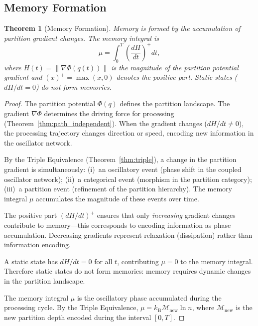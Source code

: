 \documentclass[twocolumn,10pt]{article}
\newtheorem{theorem}{Theorem}[section]
\theoremstyle{remark}
\newcommand{\kB}{k_{\mathrm{B}}}
\newcommand{\Depth}{\mathcal{M}}
\begin{document}
\subsection{Memory Formation}

\begin{theorem}[Memory Formation]
\label{thm:memory_formation}
Memory is formed by the accumulation of partition gradient changes. The memory integral is
\begin{equation}
\mu = \int_0^T \left(\frac{dH}{dt}\right)^{\!+} dt,
\label{eq:memory_integral}
\end{equation}
where $H(t) = \|\nabla \Phi(q(t))\|$ is the magnitude of the partition potential gradient and $(x)^+ = \max(x, 0)$ denotes the positive part. Static states ($dH/dt = 0$) do not form memories.
\end{theorem}

\begin{proof}
The partition potential $\Phi(q)$ defines the partition landscape. The gradient $\nabla\Phi$ determines the driving force for processing (Theorem~\ref{thm:path_independent}). When the gradient changes ($dH/dt \neq 0$), the processing trajectory changes direction or speed, encoding new information in the oscillator network.

By the Triple Equivalence (Theorem~\ref{thm:triple}), a change in the partition gradient is simultaneously: (i)~an oscillatory event (phase shift in the coupled oscillator network); (ii)~a categorical event (morphism in the partition category); (iii)~a partition event (refinement of the partition hierarchy). The memory integral $\mu$ accumulates the magnitude of these events over time.

The positive part $(dH/dt)^+$ ensures that only \emph{increasing} gradient changes contribute to memory---this corresponds to encoding information as phase accumulation. Decreasing gradients represent relaxation (dissipation) rather than information encoding.

A static state has $dH/dt = 0$ for all $t$, contributing $\mu = 0$ to the memory integral. Therefore static states do not form memories: memory requires dynamic changes in the partition landscape.

The memory integral $\mu$ is the oscillatory phase accumulated during the processing cycle. By the Triple Equivalence, $\mu = \kB \Depth_{\mathrm{new}} \ln n$, where $\Depth_{\mathrm{new}}$ is the new partition depth encoded during the interval $[0, T]$.
\end{proof}
\end{document}
